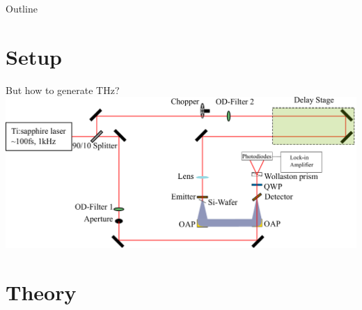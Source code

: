 \documentclass[aspectratio=1610, 9pt]{beamer}
\begin{document}
\begin{frame}{Outline}
  \tableofcontents
\end{frame}

\section{Setup}

\begin{frame}{But how to generate THz?}
  \includegraphics[width=\textwidth]{images/Aufbau.pdf}
\end{frame}

\section{Theory}
\end{document}
